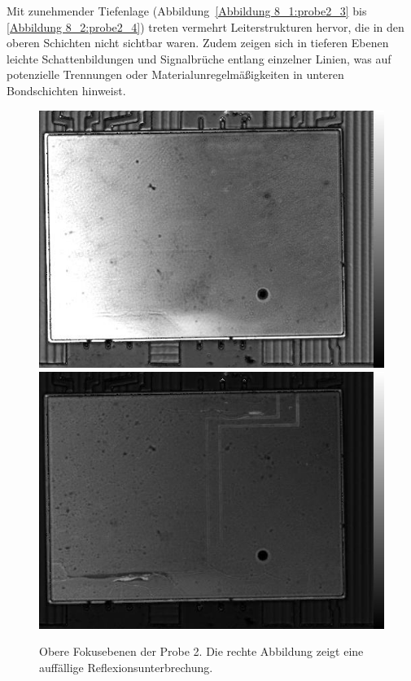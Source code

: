 Mit zunehmender Tiefenlage (Abbildung~\ref{Abbildung 8_1:probe2_3} bis \ref{Abbildung 8_2:probe2_4}) treten vermehrt Leiterstrukturen hervor, die in den oberen Schichten nicht sichtbar waren. Zudem zeigen sich in tieferen Ebenen leichte Schattenbildungen und Signalbrüche entlang einzelner Linien, was auf potenzielle Trennungen oder Materialunregelmäßigkeiten in unteren Bondschichten hinweist.
\vspace{0.2cm}
\begin{figure}[htbp]
    \centering
    \includegraphics[scale=0.30]{Bilder/Probe2_i794_x001.jpg}
    \includegraphics[scale=0.30]{Bilder/Probe2_i794_x002.jpg}
    \caption{Obere Fokusebenen der Probe 2. Die rechte Abbildung zeigt eine auffällige Reflexionsunterbrechung.}
    \label{Abbildung 7_1:probe2_1}
    \label{Abbildung 7_2:probe2_2}
\end{figure}

